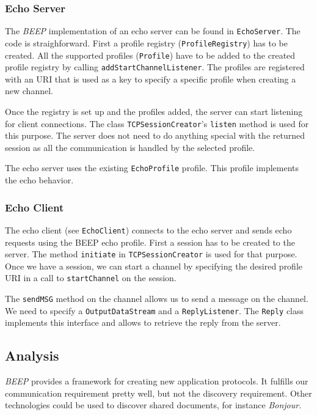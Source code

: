 \subsubsection{Echo Server}
The \emph{BEEP} implementation of an echo server can be found in \texttt{EchoServer}. The code is straighforward. First a profile registry (\texttt{ProfileRegistry}) has to be created. All the supported profiles (\texttt{Profile}) have to be added to the created profile registry by calling \texttt{addStartChannelListener}. The profiles are registered with an URI that is used as a key to specify a specific profile when creating a new channel.

Once the registry is set up and the profiles added, the server can start listening for client connections. The class \texttt{TCPSessionCreator}'s \texttt{listen} method is used for this purpose. The server does not need to do anything special with the returned session as all the communication is handled by the selected profile.

The echo server uses the existing \texttt{EchoProfile} profile. This profile implements the echo behavior.

\subsubsection{Echo Client}
The echo client (see \texttt{EchoClient}) connects to the echo server and sends echo requests using the BEEP echo profile. First a session has to be created to the server. The method \texttt{initiate} in \texttt{TCPSessionCreator} is used for that purpose. Once we have a session, we can start a channel by specifying the desired profile URI in a call to \texttt{startChannel} on the session.

The \texttt{sendMSG} method on the channel allows us to send a message on the channel. We need to specify a \texttt{OutputDataStream} and a \texttt{ReplyListener}. The \texttt{Reply} class implements this interface and allows to retrieve the reply from the server.



\subsection{Analysis}
\emph{BEEP} provides a framework for creating new application protocols. It fulfills our communication requirement pretty well, but not the discovery requirement. Other technologies could be used to discover shared documents, for instance \emph{Bonjour}.

